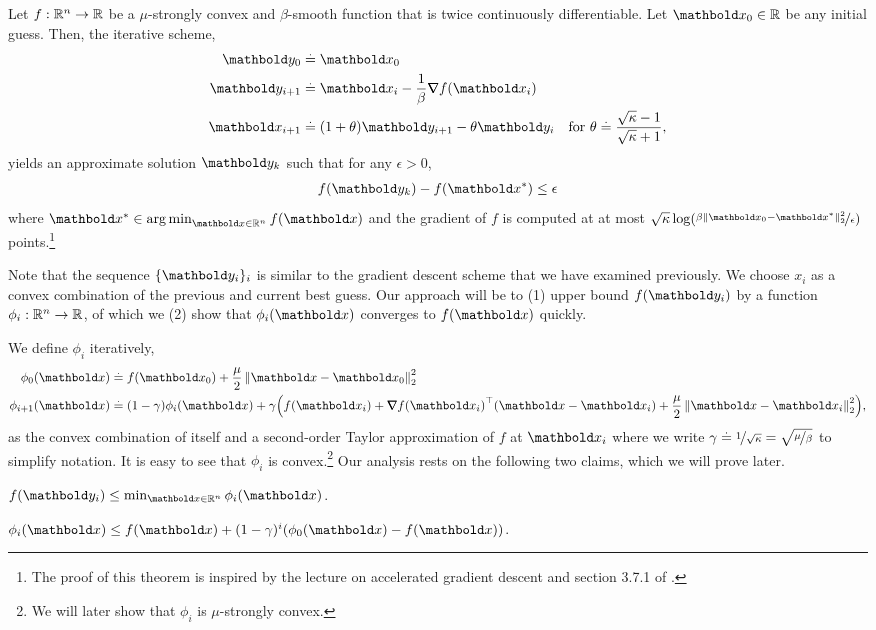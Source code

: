 \documentclass{tufte-handout}
\begin{document}
\begin{thm}\label{thm:part:1F:2}
Let $f : \mathbb{R}^n \to \mathbb{R}$ be a $\mu$-strongly convex and $\beta$-smooth function that is twice continuously differentiable. Let $\vx_0 \in \R$ be any initial guess. Then, the iterative scheme, \begin{align}
    \vy_0 &\defeq \vx_0 \\
    \vy_{i+1} &\defeq \vx_i - \frac{1}{\beta}\grad f(\vx_i) \\
    \vx_{i+1} &\defeq (1+\theta)\vy_{i+1} - \theta\vy_i \quad \text{for $\theta \defeq \frac{\sqrt{\kappa}-1}{\sqrt{\kappa}+1}$},
\end{align} yields an approximate solution $\vy_k$ such that for any $\epsilon > 0$, \begin{align*}
    f(\vy_k) - f(\s{\vx}) \leq \epsilon
\end{align*} where $\s{\vx} \in \argmin_{\vx \in \R^n} f(\vx)$ and the gradient of $f$ is computed at at most $\sqrt{\kappa} \log(\nicefrac{\beta \norm{\vx_0 - \s{\vx}}_2^2}{\epsilon})$ points.\footnote{The proof of this theorem is inspired by the lecture on accelerated gradient descent and section 3.7.1 of \citep{bubeck2015convex}.}
\end{thm}

Note that the sequence $\{\vy_i\}_i$ is similar to the gradient descent scheme that we have examined previously. We choose $x_i$ as a convex combination of the previous and current best guess. Our approach will be to (1) upper bound $f(\vy_i)$ by a function $\phi_i : \mathbb{R}^n \to \mathbb{R}$, of which we (2) show that $\phi_i(\vx)$ converges to $f(\vx)$ quickly.

We define $\phi_i$ iteratively, \begin{align}
    \phi_0(\vx) &\defeq f(\vx_0) + \frac{\mu}{2}\norm{\vx - \vx_0}_2^2 \label{eq:part:1F:phi_base} \\
    \phi_{i+1}(\vx) &\defeq (1-\gamma)\phi_i(\vx) + \gamma\parentheses*{f(\vx_i) + \trans{\grad f(\vx_i)}(\vx - \vx_i) + \frac{\mu}{2}\norm{\vx - \vx_i}_2^2}, \label{eq:part:1F:phi_ind}
\end{align} as the convex combination of itself and a second-order Taylor approximation of $f$ at $\vx_i$ where we write $\gamma \overset{.}{=} \nicefrac{1}{\sqrt{\kappa}} = \sqrt{\nicefrac{\mu}{\beta}}$ to simplify notation. It is easy to see that $\phi_i$ is convex.\footnote{We will later show that $\phi_i$ is $\mu$-strongly convex.} Our analysis rests on the following two claims, which we will prove later.

\begin{clm}\label{clm:part:1F:1}
$f(\vy_i) \leq \min_{\vx \in \R^n} \phi_i(\vx)$.
\end{clm}
\begin{clm}\label{clm:part:1F:2}
$\phi_i(\vx) \leq f(\vx) + (1-\gamma)^i(\phi_0(\vx) - f(\vx))$.
\end{clm}
\end{document}
